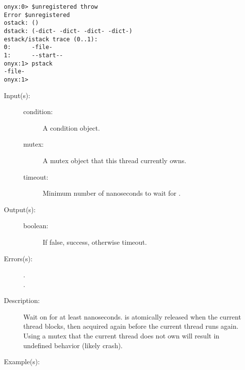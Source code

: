 \begin{description}
\begin{description}
\begin{verbatim}
onyx:0> $unregistered throw
Error $unregistered
ostack: ()
dstack: (-dict- -dict- -dict- -dict-)
estack/istack trace (0..1):
0:      -file-
1:      --start--
onyx:1> pstack
-file-
onyx:1>
		\end{verbatim}
	\end{description}
\label{systemdict:timedwait}
\item[{\onyxop{condition mutex timeout}{timedwait}{boolean}}: ]
	\begin{description}\item[]
	\item[Input(s): ]
		\begin{description}\item[]
		\item[condition: ]
			A condition object.
		\item[mutex: ]
			A mutex object that this thread currently owns.
		\item[timeout: ]
			Minimum number of nanoseconds to wait for
			.
		\end{description}
	\item[Output(s): ]
		\begin{description}\item[]
		\item[boolean: ]
			If false, success, otherwise timeout.
		\end{description}
	\item[Errors(s): ]
		\begin{description}\item[]
		\item[.]
		\item[.]
		\end{description}
	\item[Description: ]
		Wait on  for at least 
		nanoseconds.   is atomically released when the
		current thread blocks, then acquired again before the current
		thread runs again.  Using a mutex that the current thread does
		not own will result in undefined behavior (likely crash).
	\item[Example(s): ]\begin{verbatim}


\end{verbatim}
\end{description}
\end{description}
